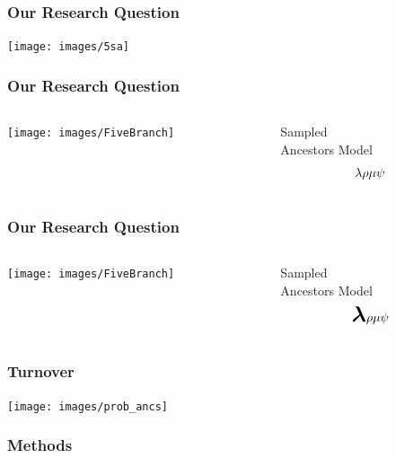 \documentclass[]{beamer}
\begin{document}
\begin{frame}
\frametitle{Our Research Question}
\texttt{[image: images/5sa]} \\
\end{frame}

\begin{frame}
\frametitle{Our Research Question}
\begin{columns}
\begin{column}{0.5\textwidth}
\texttt{[image: images/FiveBranch]} \\
\end{column}
\begin{column}{0.5\textwidth}
\begin{center}
Sampled \\ Ancestors Model \\
\[\lambda \\
\rho \\
\mu \\
 \psi \]
\end{center}
\end{column}
\end{columns}
\end{frame}

\begin{frame}
\frametitle{Our Research Question}
\begin{columns}
\begin{column}{0.5\textwidth}
\texttt{[image: images/FiveBranch]} \\
\end{column}
\begin{column}{0.5\textwidth}
\begin{center}
Sampled \\ Ancestors Model \\
\[\mathlarger{\mathlarger{\mathlarger{\boldsymbol{\lambda}}}}\\
\rho \\
\mu \\
 \psi \]
\end{center}
\end{column}
\end{columns}
\end{frame}

\begin{frame}
\frametitle{Turnover}
\texttt{[image: images/prob\_ancs]} \\

\end{frame}

\begin{frame}
\frametitle{Methods}
\end{frame}
\end{document}
